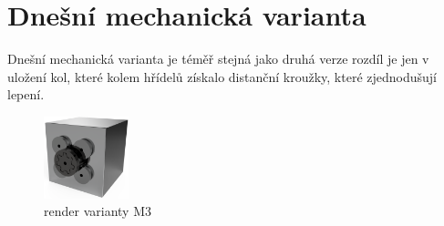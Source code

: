 \section{Dnešní mechanická varianta}

Dnešní mechanická varianta je téměř stejná jako druhá verze rozdíl je jen v uložení kol, které kolem hřídelů získalo distanční kroužky, které
zjednodušují lepení. 

\begin{figure}[htbp]
    \centering
    \includegraphics[width=70pt]{kapitoly/obrazky/M3/predni_render.png}
    \caption{render varianty M3}
    \label{fig:M3-render}
\end{figure}

